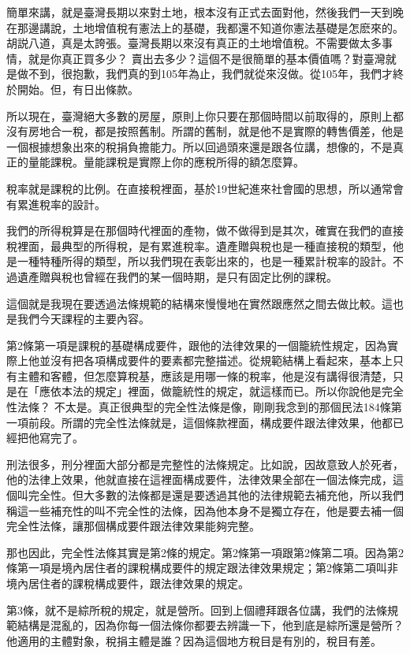 \documentclass[]{ctexbook}
\begin{document}
簡單來講，就是臺灣長期以來對土地，根本沒有正式去面對他，然後我們一天到晚在那邊講說，土地增值稅有憲法上的基礎，我都還不知道你憲法基礎是怎麽來的。胡説八道，真是太誇張。臺灣長期以來沒有真正的土地增值稅。不需要做太多事情，就是你真正買多少？ 賣出去多少？這個不是很簡單的基本價值嗎？對臺灣就是做不到，很抱歉，我們真的到105年為止，我們就從來沒做。從105年，我們才終於開始。但，有日出條款。

所以現在，臺灣絕大多數的房屋，原則上你只要在那個時間以前取得的，原則上都沒有房地合一稅，都是按照舊制。所謂的舊制，就是他不是實際的轉售價差，他是一個根據想象出來的稅捐負擔能力。所以回過頭來還是跟各位講，想像的，不是真正的量能課稅。量能課稅是實際上你的應稅所得的額怎麼算。

稅率就是課稅的比例。在直接稅裡面，基於19世紀進來社會國的思想，所以通常會有累進稅率的設計。

我們的所得稅算是在那個時代裡面的產物，做不做得到是其次，確實在我們的直接稅裡面，最典型的所得稅，是有累進稅率。遺產贈與稅也是一種直接稅的類型，他是一種特種所得的類型，所以我們現在表彰出來的，也是一種累計稅率的設計。不過遺產贈與稅也曾經在我們的某一個時期，是只有固定比例的課稅。

這個就是我現在要透過法條規範的結構來慢慢地在實然跟應然之間去做比較。這也是我們今天課程的主要內容。

第2條第一項是課稅的基礎構成要件，跟他的法律效果的一個籠統性規定，因為實際上他並沒有把各項構成要件的要素都完整描述。從規範結構上看起來，基本上只有主體和客體，但怎麼算稅基，應該是用哪一條的稅率，他是沒有講得很清楚，只是在「應依本法的規定」裡面，做籠統性的規定，就這樣而已。所以你說他是完全性法條？ 不太是。真正很典型的完全性法條是像，剛剛我念到的那個民法184條第一項前段。所謂的完全性法條就是，這個條款裡面，構成要件跟法律效果，他都已經把他寫完了。

刑法很多，刑分裡面大部分都是完整性的法條規定。比如說，因故意致人於死者，他的法律上效果，他就直接在這裡面構成要件，法律效果全部在一個法條完成，這個叫完全性。但大多數的法條都是還是要透過其他的法律規範去補充他，所以我們稱這一些補充性的叫不完全性的法條，因為他本身不是獨立存在，他是要去補一個完全性法條，讓那個構成要件跟法律效果能夠完整。

那也因此，完全性法條其實是第2條的規定。第2條第一項跟第2條第二項。因為第2條第一項是境內居住者的課稅構成要件的規定跟法律效果規定；第2條第二項叫非境內居住者的課稅構成要件，跟法律效果的規定。

第3條，就不是綜所稅的規定，就是營所。回到上個禮拜跟各位講，我們的法條規範結構是混亂的，因為你每一個法條你都要去辨識一下，他到底是綜所還是營所？他適用的主體對象，稅捐主體是誰？因為這個地方稅目是有別的，稅目有差。
\end{document}
